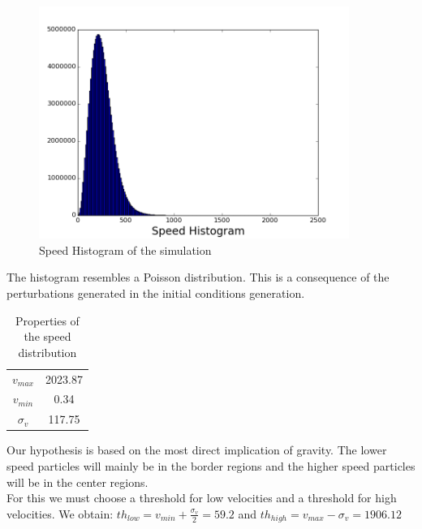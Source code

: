 \documentclass[12pt]{article}
\begin{document}
\begin{figure}[ht]
\begin{center}
\includegraphics[width=0.9\textwidth]{graphs/hist_vel.png} %
\caption{Speed Histogram of the simulation}
\label{fg:hist_vel}
\end{center}
\end{figure}
\FloatBarrier

The histogram resembles a Poisson distribution. This is a consequence of the perturbations generated in the initial conditions generation. 

\begin{table}[ht]
    \centering
    \begin{tabular}{|c|c|}
        $v_{max}$ & 2023.87 \\
        $v_{min}$ & 0.34\\
        $\sigma_{v}$ & 117.75 
    \end{tabular}
    \caption{Properties of the speed distribution}
    \label{tab:vel}
\end{table}
\FloatBarrier

Our hypothesis is based on the most direct implication of gravity. The lower speed
particles will mainly be in the border regions and the higher speed particles
will be in the center regions. \\

For this we must choose a threshold for low velocities and a threshold for high velocities. 
We obtain: $th_{low} = v_{min} + \frac{\sigma_{v}}{2} = 59.2$ and $th_{high} = v_{max}  - \sigma_{v} = 1906.12 $
\end{document}
